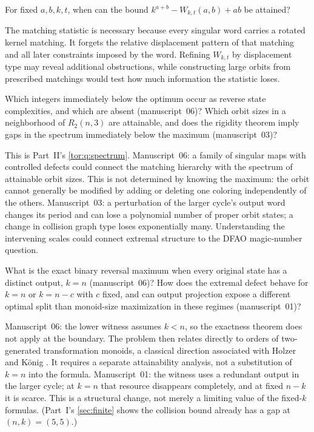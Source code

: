 \documentclass[11pt,a4paper]{article}
\numberwithin{equation}{section}
\theoremstyle{definition}
\theoremstyle{remark}
\begin{document}
\begin{question}\label{evo:q:matching}
For fixed $a,b,k,t$, when can the bound $k^{a+b}-W_{k,t}(a,b)+ab$ be attained?
\end{question}
The matching statistic is necessary because every singular word carries a
rotated kernel matching. It forgets the relative displacement pattern of that
matching and all later constraints imposed by the word. Refining $W_{k,t}$ by
displacement type may reveal additional obstructions, while constructing large
orbits from prescribed matchings would test how much information the
statistic loses.

\begin{question}\label{evo:q:spectrum}
Which integers immediately below the optimum occur as reverse state
complexities, and which are absent (manuscript~06)? Which orbit sizes in a
neighborhood of $R_2(n,3)$ are attainable, and does the rigidity theorem imply
gaps in the spectrum immediately below the maximum (manuscript~03)?
\end{question}
This is Part~II's \cref{tor:q:spectrum}. Manuscript~06: a family of singular
maps with controlled defects could connect the matching hierarchy with the
spectrum of attainable orbit sizes. This is not determined by knowing the
maximum: the orbit cannot generally be modified by adding or deleting one
coloring independently of the others. Manuscript~03: a perturbation of the
larger cycle's output word changes its period and can lose a polynomial number
of proper orbit states; a change in collision graph type loses exponentially
many. Understanding the intervening scales could connect extremal structure
to the DFAO magic-number question.

\begin{question}\label{evo:q:diagonal}
What is the exact binary reversal maximum when every original state has a
distinct output, $k=n$ (manuscript~06)? How does the extremal defect behave
for $k=n$ or $k=n-c$ with $c$ fixed, and can output projection expose a
different optimal split than monoid-size maximization in these regimes
(manuscript~01)?
\end{question}
Manuscript~06: the lower witness assumes $k<n$, so the exactness theorem does
not apply at the boundary. The problem then relates directly to orders of
two-generated transformation monoids, a classical direction associated with
Holzer and K\"onig \cite{HolzerKoenig2004}. It requires a separate
attainability analysis, not a substitution of $k=n$ into the formula.
Manuscript~01: the witness uses a redundant output in the larger cycle; at
$k=n$ that resource disappears completely, and at fixed $n-k$ it is scarce.
This is a structural change, not merely a limiting value of the fixed-$k$
formulas. (Part~I's \cref{sec:finite} shows the collision bound already has a
gap at $(n,k)=(5,5)$.)
\end{document}
